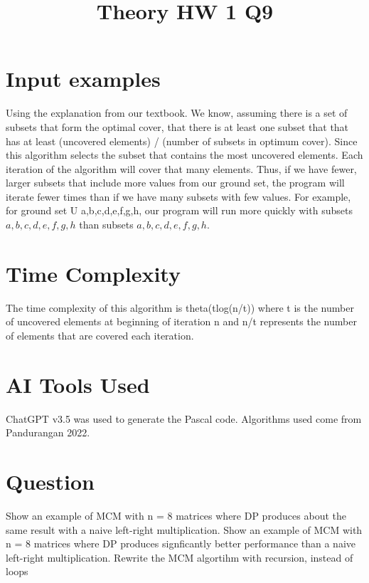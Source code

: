\documentclass[conference]{IEEEtran}
\begin{document}
\section{Input examples}
Using the explanation from our textbook. We know, assuming there is a set of subsets that form the optimal cover, that there is at least one subset that that has at least (uncovered elements) / (number of subsets in optimum cover). Since this algorithm selects the subset that contains the most uncovered elements. Each iteration of the algorithm will cover that many elements. Thus, if we have fewer, larger subsets that include more values from our ground set, the program will iterate fewer times than if we have many subsets with few values. For example, for ground set U {a,b,c,d,e,f,g,h}, our program will run more quickly with subsets ${a,b,c,d}, {e,f,g,h}$ than subsets ${a}, {b}, {c}, {d}, {e}, {f}, {g}, {h}$.

\section{Time Complexity}
The time complexity of this algorithm is theta(tlog(n/t)) where t is the number of uncovered elements at beginning of iteration n and n/t represents the number of elements that are covered each iteration.

\section{AI Tools Used}
ChatGPT v3.5 was used to generate the Pascal code. Algorithms used come from Pandurangan 2022.

\title{Theory HW 1 Q9}

\author{
}

\maketitle

\section{Question}
%
Show an example of MCM with n = 8 matrices where DP produces about the same result with
a naive left-right multiplication.
Show an example of MCM with n = 8 matrices where DP produces signficantly better performance than a naive left-right multiplication.
Rewrite the MCM algortihm with recursion, instead of loops
\end{document}
